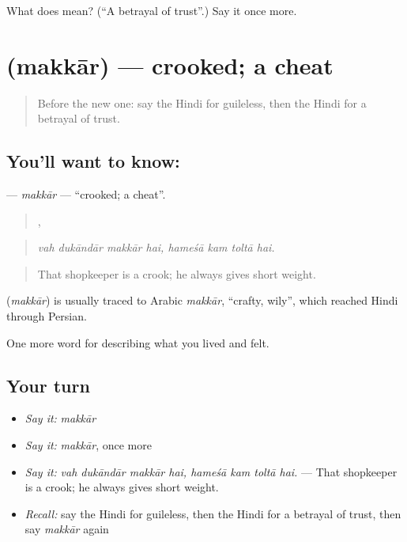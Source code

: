 \begin{tcolorbox}[breakable,colback=teal!4,colframe=teal!35!black,title={Before you move on}]
What does  mean? (\textquotedblleft{}A betrayal of trust\textquotedblright{}.) Say it once more.
\end{tcolorbox}
\section[\texorpdfstring{\hi{मक्कार} (makkār)}{मक्कार (makkār)}]{ (makkār) — crooked; a cheat}

\label{lesson:HI-C467-makkar}



\begin{quote}
Before the new one: say the Hindi for guileless, then the Hindi for a betrayal of trust.
\end{quote}

\subsection*{You'll want to know: }
\textbf{} — \emph{makkār} — \textquotedblleft{}crooked; a cheat\textquotedblright{}.

\begin{quote}
   ,    
\end{quote}

\begin{quote}
\emph{vah dukāndār makkār hai, hameśā kam toltā hai.}
\end{quote}

\begin{quote}
That shopkeeper is a crook; he always gives short weight.
\end{quote}

\begin{cousinweb}
\textbf{} (\emph{makkār}) is usually traced to Arabic \emph{makkār}, \textquotedblleft{}crafty, wily\textquotedblright{}, which reached Hindi through Persian.
\end{cousinweb}

\begin{grammarlens}[title={What you've built}]
One more word for describing what you lived and felt.
\end{grammarlens}

\subsection*{Your turn}
\begin{itemize}
\raggedright
  \item \emph{Say it:} \emph{makkār}
  \item \emph{Say it:} \emph{makkār}, once more
  \item \emph{Say it:} \emph{vah dukāndār makkār hai, hameśā kam toltā hai.} — That shopkeeper is a crook; he always gives short weight.
  \item \emph{Recall:} say the Hindi for guileless, then the Hindi for a betrayal of trust, then say \emph{makkār} again
\end{itemize}

